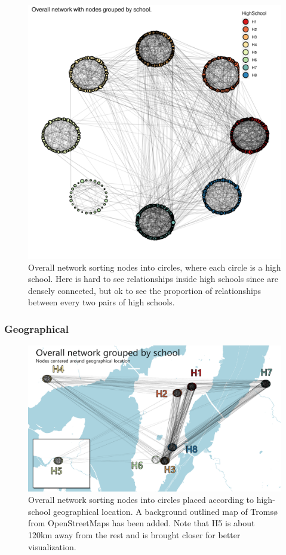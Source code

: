     \begin{figure}[h]
        \centering
            \includegraphics[width=0.7\linewidth]{figures/Networks/Layouts/Graph_OverallNetwork_HS_societal_HighSchool___manual.png} 
        \caption{Overall network sorting nodes into circles, where each circle is a high school. Here is hard to see relationships inside high schools since are densely connected, but ok to see the proportion of relationships between every two pairs of high schools.}
        \label{figure:networksLayoutsMANUAL}
    \end{figure}        

    \newpage

\clearpage

\subsubsection{Geographical}

    \begin{figure}[h!]
        \centering
            \includegraphics[width=0.9\linewidth]{figures/Networks/Layouts/schoolmapsGraph.png} 
        \caption{Overall network sorting nodes into circles placed according to high-school geographical location. A background outlined map of Tromsø from OpenStreetMaps has been added. Note that H5 is about 120km away from the rest and is brought closer for better visualization.}
        \label{figure:networksLayoutsGEOGRAPHICAL}
    \end{figure}        


